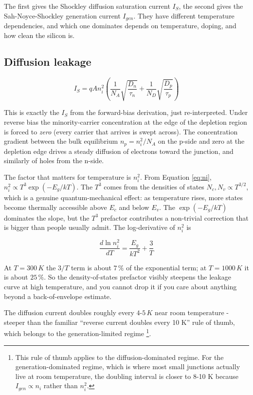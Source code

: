 The first gives the Shockley diffusion saturation current \(I_S\), the
second gives the Sah-Noyce-Shockley generation current \(I_{gen}\). They
have different temperature dependencies, and which one dominates depends
on temperature, doping, and how clean the silicon is.

\subsection{Diffusion leakage}\label{diffusion-leakage}

\[ I_S = q A n_i^2 \left( \frac{1}{N_A}\sqrt{\frac{D_n}{\tau_n}} + \frac{1}{N_D}\sqrt{\frac{D_p}{\tau_p}} \right) \]

This is exactly the \(I_S\) from the forward-bias derivation, just
re-interpreted. Under reverse bias the minority-carrier concentration at
the edge of the depletion region is forced to \emph{zero} (every carrier
that arrives is swept across). The concentration gradient between the
bulk equilibrium \(n_p = n_i^2/N_A\) on the p-side and zero at the
depletion edge drives a steady diffusion of electrons toward the
junction, and similarly of holes from the n-side.

The factor that matters for temperature is \(n_i^2\). From Equation
\eqref{eq:ni}, \(n_i^2 \propto T^3 \exp(-E_g/kT)\). The \(T^3\) comes
from the densities of states \(N_c, N_v \propto T^{3/2}\), which is a
genuine quantum-mechanical effect: as temperature rises, more states
become thermally accessible above \(E_c\) and below \(E_v\). The
\(\exp(-E_g/kT)\) dominates the slope, but the \(T^3\) prefactor
contributes a non-trivial correction that is bigger than people usually
admit. The log-derivative of \(n_i^2\) is

\[ \frac{d \ln n_i^2}{dT} = \frac{E_g}{kT^2} + \frac{3}{T} \]

At \(T = 300\, K\) the \(3/T\) term is about \(7\, \%\) of the
exponential term; at \(T = 1000\, K\) it is about \(25\, \%\). So the
density-of-states prefactor visibly steepens the leakage curve at high
temperature, and you cannot drop it if you care about anything beyond a
back-of-envelope estimate.

The diffusion current doubles roughly every \(4\)-\(5\, K\) near room
temperature - steeper than the familiar ``reverse current doubles every
10 K'' rule of thumb, which belongs to the generation-limited regime
\footnote{This rule of thumb applies to the diffusion-dominated regime.
  For the generation-dominated regime, which is where most small
  junctions actually live at room temperature, the doubling interval is
  closer to 8-10 K because \(I_{gen} \propto n_i\) rather than
  \(n_i^2\).}.

